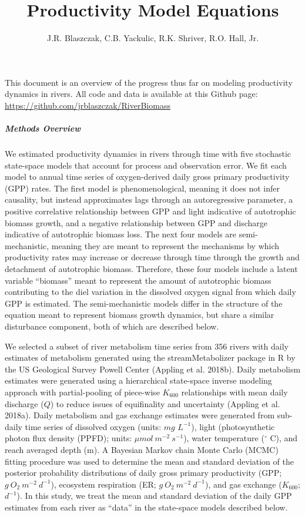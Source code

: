 \documentclass[]{article}
\title{Productivity Model Equations}
\author{J.R. Blaszczak, C.B. Yackulic, R.K. Shriver, R.O. Hall, Jr.}
\date{}
\let\oldsubparagraph\subparagraph
\renewcommand{\subparagraph}[1]{\oldsubparagraph{#1}\mbox{}}
\begin{document}
\maketitle

This document is an overview of the progress thus far on modeling
productivity dynamics in rivers. All code and data is available at this
Github page: \url{https://github.com/jrblaszczak/RiverBiomass}

\subparagraph{Methods Overview}\label{methods-overview}

We estimated productivity dynamics in rivers through time with five
stochastic state-space models that account for process and observation
error. We fit each model to annual time series of oxygen-derived daily
gross primary productivity (GPP) rates. The first model is
phenomenological, meaning it does not infer causality, but instead
approximates lags through an autoregressive parameter, a positive
correlative relationship between GPP and light indicative of autotrophic
biomass growth, and a negative relationship between GPP and discharge
indicative of autotrophic biomass loss. The next four models are
semi-mechanistic, meaning they are meant to represent the mechanisms by
which productivity rates may increase or decrease through time through
the growth and detachment of autotrophic biomass. Therefore, these four
models include a latent variable ``biomass'' meant to represent the
amount of autotrophic biomass contributing to the diel variation in the
dissolved oxygen signal from which daily GPP is estimated. The
semi-mechanistic models differ in the structure of the equation meant to
represent biomass growth dynamics, but share a similar disturbance
component, both of which are described below.

We selected a subset of river metabolism time series from 356 rivers
with daily estimates of metabolism generated using the streamMetabolizer
package in R by the US Geological Survey Powell Center (Appling et al.
2018b). Daily metabolism estimates were generated using a hierarchical
state-space inverse modeling approach with partial-pooling of piece-wise
\(K_{600}\) relationships with mean daily discharge (\(Q\)) to reduce
issues of equifinality and uncertainty (Appling et al. 2018a). Daily
metabolism and gas exchange estimates were generated from sub-daily time
series of dissolved oxygen (units: \(mg\) \(L^{-1}\)), light
(photosynthetic photon flux density (PPFD); units:
\(\mu mol\ m^{-2}\ s^{-1}\)), water temperature (\(^\circ\) C), and
reach averaged depth (m). A Bayesian Markov chain Monte Carlo (MCMC)
fitting procedure was used to determine the mean and standard deviation
of the posterior probability distributions of daily gross primary
productivity (GPP; \(g\ O_{2}\ m^{-2}\ d^{-1}\)), ecosystem respiration
(ER; \(g\ O_{2}\ m^{-2}\ d^{-1}\)), and gas exchange (\(K_{600}\);
\(d^{-1}\)). In this study, we treat the mean and standard deviation of
the daily GPP estimates from each river as ``data'' in the state-space
models described below.
\end{document}
